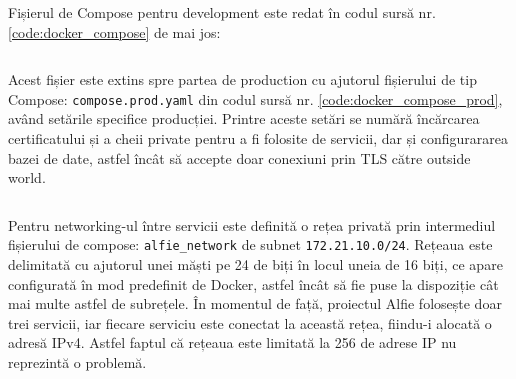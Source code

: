 Fișierul de Compose pentru development este redat în codul sursă nr. \ref{code:docker_compose} de mai jos:

\begin{code}
    \inputminted[frame=single,framesep=2mm,linenos,breaklines,tabsize=2]{yaml}{code/compose.yaml}
    \label{code:docker_compose}
\end{code}

Acest fișier este extins spre partea de production cu ajutorul fișierului de tip Compose: \texttt{compose.prod.yaml} din codul sursă nr. \ref{code:docker_compose_prod}, având setările specifice producției. Printre aceste setări se numără încărcarea certificatului și a cheii private pentru a fi folosite de servicii, dar și configurararea bazei de date, astfel încât să accepte doar conexiuni prin TLS către outside world.

\begin{code}
    \inputminted[frame=single,framesep=2mm,linenos,breaklines,tabsize=2]{yaml}{code/compose.prod.yaml}
    \label{code:docker_compose_prod}
\end{code}

Pentru networking-ul între servicii este definită o rețea privată prin intermediul fișierului de compose: \texttt{alfie_network} de subnet \texttt{172.21.10.0/24}. Rețeaua este delimitată cu ajutorul unei măști pe 24 de biți în locul uneia de 16 biți, ce apare configurată în mod predefinit de Docker, astfel încât să fie puse la dispoziție cât mai multe astfel de subrețele. În momentul de față, proiectul Alfie folosește doar trei servicii, iar fiecare serviciu este conectat la această rețea, fiindu-i alocată o adresă IPv4. Astfel faptul că rețeaua este limitată la 256 de adrese IP nu reprezintă o problemă.

